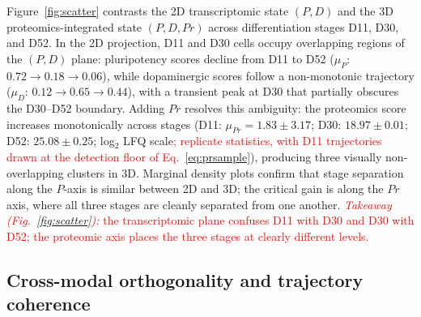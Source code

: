 \documentclass[5p,times,twocolumn]{elsarticle}
\newcommand{\rtag}[1]{}
\newcommand{\rev}[2]{\rtag{#1}\textcolor{red}{#2}}
\begin{document}
Figure~\ref{fig:scatter} contrasts the 2D transcriptomic state
$(P, D)$ and the 3D proteomics-integrated state $(P, D, Pr)$
across differentiation stages D11, D30, and D52.
In the 2D projection, D11 and D30 cells occupy overlapping
regions of the $(P, D)$ plane: pluripotency scores decline
from D11 to D52 ($\mu_{P}$: $0.72 \to 0.18 \to 0.06$),
while dopaminergic scores follow a non-monotonic trajectory
($\mu_{D}$: $0.12 \to 0.65 \to 0.44$), with a transient
peak at D30 that partially obscures the D30--D52 boundary.
Adding $Pr$ resolves this ambiguity: the proteomics score
increases monotonically across stages
(D11: $\mu_{Pr} = 1.83 \pm 3.17$;
D30: $18.97 \pm 0.01$;
D52: $25.08 \pm 0.25$; log$_{2}$ LFQ scale\rev{AC}{; replicate
  statistics, with D11 trajectories drawn at the detection floor
  of Eq.~\eqref{eq:prsample}}),
producing three visually non-overlapping clusters in 3D.
Marginal density plots confirm that stage separation along the
$P$-axis is similar between 2D and 3D; the critical gain is
along the $Pr$ axis, where all three stages are cleanly
separated from one another.
\rev{R1.13}{\textit{Takeaway (Fig.~\ref{fig:scatter}):} the
  transcriptomic plane confuses D11 with D30 and D30 with D52;
  the proteomic axis places the three stages at clearly different
  levels.}

\subsection{\textbf{Cross-modal orthogonality and trajectory
    coherence}}
\label{sec:res_orthog}


\begin{table}[!htbp]
  \caption{%
    Cross-modal Spearman correlations among $(P, D, Pr)$ per stage
    with bootstrap 95\% CIs ($n = 1{,}000$ resamples).
    All $Pr$ correlations have CIs straddling zero.}
  \label{tab:correlations}
  \centering
\end{table}
\end{document}
